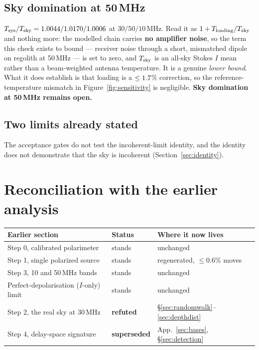 \documentclass[11pt]{article}
\begin{document}
\subsection{Sky domination at 50\,MHz}

$T_{\rm sys}/T_{\rm sky} = 1.0044 / 1.0170 / 1.0006$ at
$30/50/10$\,MHz. Read it as $1 + T_{\rm loading}/T_{\rm sky}$ and
nothing more: the modelled chain carries \textbf{no amplifier noise},
so the term this check exists to bound --- receiver noise through a
short, mismatched dipole on regolith at 50\,MHz --- is set to zero, and
$T_{\rm sky}$ is an all-sky Stokes $I$ mean rather than a beam-weighted
antenna temperature. It is a genuine \emph{lower bound}. What it does
establish is that loading is a $\le1.7$\% correction, so the
reference-temperature mismatch in Figure~\ref{fig:sensitivity} is
negligible. \textbf{Sky domination at 50\,MHz remains open.}

\subsection{Two limits already stated}

The acceptance gates do not test the incoherent-limit identity, and the
identity does not demonstrate that the sky is incoherent
(Section~\ref{sec:identity}).

\section{Reconciliation with the earlier analysis}
\label{sec:reconcile}

\begin{center}
\begin{tabular}{lll}
\toprule
Earlier section & Status & Where it now lives \\
\midrule
Step 0, calibrated polarimeter & stands & unchanged \\
Step 1, single polarized source & stands & regenerated, $\le0.6\%$ moves \\
Step 3, 10 and 50\,MHz bands & stands & unchanged \\
Perfect-depolarisation ($I$-only) limit & stands & unchanged \\
\midrule
Step 2, the real sky at 30\,MHz & \textbf{refuted} & \S\ref{sec:randomwalk}--\ref{sec:depthdist} \\
Step 4, delay-space signature & \textbf{superseded}
  & App.~\ref{sec:bases}, \S\ref{sec:detection} \\
\bottomrule
\end{tabular}
\end{center}
\end{document}
